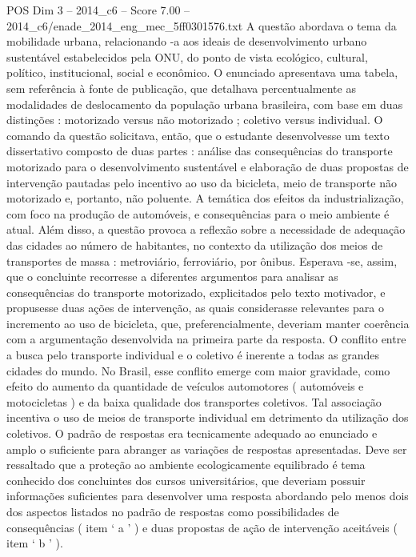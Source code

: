 \begin{textsample}{POS Dim 3 – 2014\_c6 – Score 7.00 – 2014\_c6/enade\_2014\_eng\_mec\_5ff0301576.txt}
A questão abordava o tema da mobilidade urbana, relacionando -a aos ideais de desenvolvimento urbano sustentável estabelecidos pela ONU, do ponto de vista ecológico, cultural, político, institucional, social e econômico.
O enunciado apresentava uma tabela, sem referência à fonte de publicação, que detalhava percentualmente as modalidades de deslocamento da população urbana brasileira, com base em duas distinções : motorizado versus não motorizado ; coletivo versus individual.
O comando da questão solicitava, então, que o estudante desenvolvesse um texto dissertativo composto de duas partes : análise das consequências do transporte motorizado para o desenvolvimento sustentável e elaboração de duas propostas de intervenção pautadas pelo incentivo ao uso da bicicleta, meio de transporte não motorizado e, portanto, não poluente.
A temática dos efeitos da industrialização, com foco na produção de automóveis, e consequências para o meio ambiente é atual.
Além disso, a questão provoca a reflexão sobre a necessidade de adequação das cidades ao número de habitantes, no contexto da utilização dos meios de transportes de massa : metroviário, ferroviário, por ônibus.
Esperava -se, assim, que o concluinte recorresse a diferentes argumentos para analisar as consequências do transporte motorizado, explicitados pelo texto motivador, e propusesse duas ações de intervenção, as quais considerasse relevantes para o incremento ao uso de bicicleta, que, preferencialmente, deveriam manter coerência com a argumentação desenvolvida na primeira parte da resposta.
O conflito entre a busca pelo transporte individual e o coletivo é inerente a todas as grandes cidades do mundo.
No Brasil, esse conflito emerge com maior gravidade, como efeito do aumento da quantidade de veículos automotores ( automóveis e motocicletas ) e da baixa qualidade dos transportes coletivos.
Tal associação incentiva o uso de meios de transporte individual em detrimento da utilização dos coletivos.
O padrão de respostas era tecnicamente adequado ao enunciado e amplo o suficiente para abranger as variações de respostas apresentadas.
Deve ser ressaltado que a proteção ao ambiente ecologicamente equilibrado é tema conhecido dos concluintes dos cursos universitários, que deveriam possuir informações suficientes para desenvolver uma resposta abordando pelo menos dois dos aspectos listados no padrão de respostas como possibilidades de consequências ( item ‘ a ’ ) e duas propostas de ação de intervenção aceitáveis ( item ‘ b ’ ).

\end{textsample}
